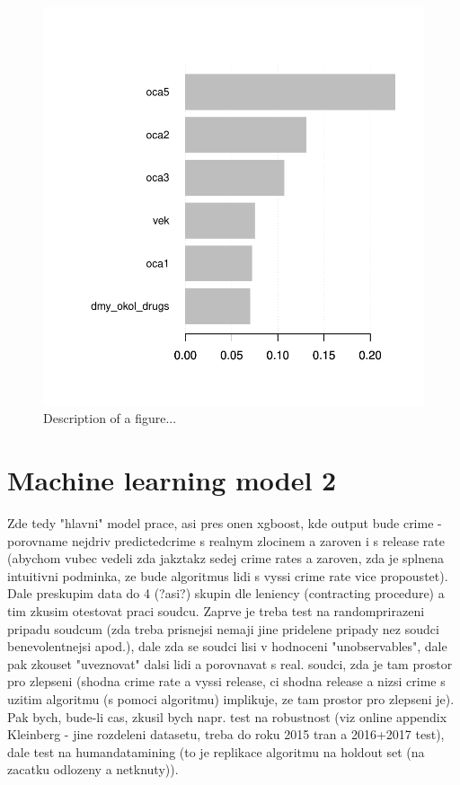 \documentclass[12pt, twoside,openany]{book} %
\begin{document}
\begin{figure}[ht]
\small{

\includegraphics[width=\textwidth]{figure_importance_ml1.pdf}
Description of a figure...
}
\end{figure}




\section{Machine learning model 2}     %

Zde tedy "hlavni" model prace, asi pres onen xgboost, kde output bude crime - porovname nejdriv predictedcrime s realnym zlocinem a zaroven i s release rate (abychom vubec vedeli zda jakztakz sedej crime rates a zaroven, zda je splnena intuitivni podminka, ze bude algoritmus lidi s vyssi crime rate vice propoustet). Dale preskupim data do 4 (?asi?) skupin dle leniency (contracting procedure) a tim zkusim otestovat praci soudcu. Zaprve je treba test na randomprirazeni pripadu soudcum (zda treba prisnejsi nemaji jine pridelene pripady nez soudci benevolentnejsi apod.), dale zda se soudci lisi v hodnoceni "unobservables", dale pak zkouset "uveznovat" dalsi lidi a porovnavat s real. soudci, zda je tam prostor pro zlepseni (shodna crime rate a vyssi release, ci shodna release a nizsi crime s uzitim algoritmu (s pomoci algoritmu) implikuje, ze tam prostor pro zlepseni je).\newline
Pak bych, bude-li cas, zkusil bych napr. test na robustnost (viz online appendix Kleinberg - jine rozdeleni datasetu, treba do roku 2015 tran a 2016+2017 test), dale test na humandatamining (to je replikace algoritmu na holdout set (na zacatku odlozeny a netknuty)).
\end{document}
